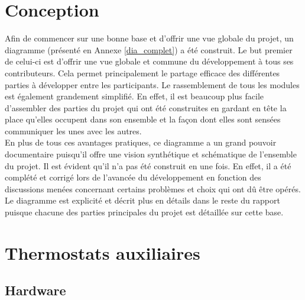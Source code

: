 \documentclass[11pt,a4paper,11pt]{report}
\begin{document}
\chapter{Conception}

Afin de commencer sur une bonne base et d'offrir une vue globale du projet, un diagramme (présenté en Annexe \ref{dia_complet}) a été construit. Le but premier de celui-ci est d'offrir une vue globale et commune du développement à tous ses contributeurs. Cela permet principalement le partage efficace des différentes parties à développer entre les participants. Le rassemblement de tous les modules est également grandement simplifié. En effet, il est beaucoup plus facile d'assembler des parties du projet qui ont été construites en gardant en tête la place qu'elles occupent dans son ensemble et la façon dont elles sont sensées communiquer les unes avec les autres.\\


En plus de tous ces avantages pratiques, ce diagramme a un grand pouvoir documentaire puisqu'il offre une vision synthétique et schématique de l'ensemble du projet.
Il est évident qu'il n'a pas été construit en une fois. En effet, il a été complété et corrigé lors de l'avancée du développement en fonction des discussions menées concernant certains problèmes et choix qui ont dû être opérés.
Le diagramme est explicité et décrit plus en détails dans le reste du rapport puisque chacune des parties principales du projet est détaillée sur cette base.



\newpage

\chapter{Thermostats auxiliaires}

\section{Hardware}
\end{document}
